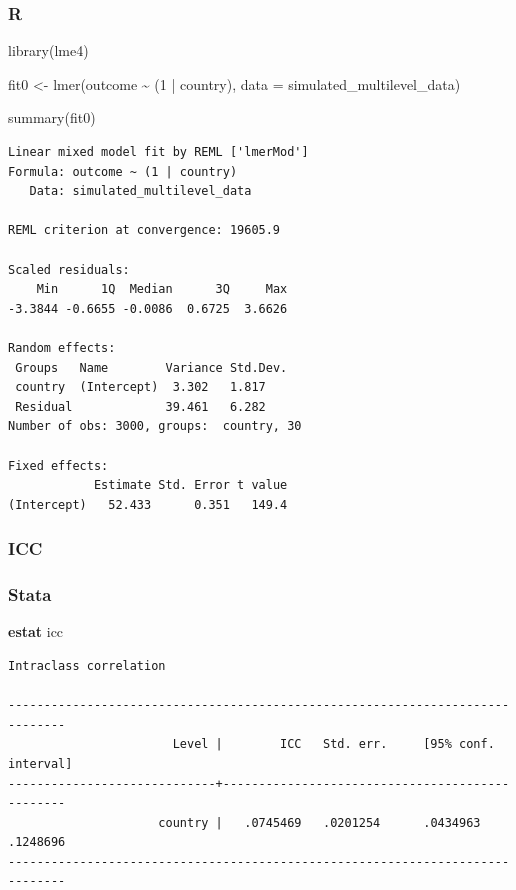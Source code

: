 \documentclass[
  letterpaper,
  DIV=11,
  numbers=noendperiod]{scrreprt}
\newenvironment{Shaded}{\begin{snugshade}}{\end{snugshade}}
\newcommand{\AttributeTok}[1]{\textcolor[rgb]{0.40,0.45,0.13}{#1}}
\newcommand{\DecValTok}[1]{\textcolor[rgb]{0.68,0.00,0.00}{#1}}
\newcommand{\FunctionTok}[1]{\textcolor[rgb]{0.28,0.35,0.67}{#1}}
\newcommand{\KeywordTok}[1]{\textcolor[rgb]{0.00,0.23,0.31}{\textbf{#1}}}
\newcommand{\NormalTok}[1]{\textcolor[rgb]{0.00,0.23,0.31}{#1}}
\newcommand{\OtherTok}[1]{\textcolor[rgb]{0.00,0.23,0.31}{#1}}
\newcommand{\SpecialCharTok}[1]{\textcolor[rgb]{0.37,0.37,0.37}{#1}}
\begin{document}
\subsubsection{R}

\begin{Shaded}
\begin{Highlighting}[]
\FunctionTok{library}\NormalTok{(lme4)}

\NormalTok{fit0 }\OtherTok{\textless{}{-}} \FunctionTok{lmer}\NormalTok{(outcome }\SpecialCharTok{\textasciitilde{}}\NormalTok{  (}\DecValTok{1} \SpecialCharTok{|}\NormalTok{ country),}
             \AttributeTok{data =}\NormalTok{ simulated\_multilevel\_data)}

\FunctionTok{summary}\NormalTok{(fit0)}
\end{Highlighting}
\end{Shaded}

\begin{verbatim}
Linear mixed model fit by REML ['lmerMod']
Formula: outcome ~ (1 | country)
   Data: simulated_multilevel_data

REML criterion at convergence: 19605.9

Scaled residuals: 
    Min      1Q  Median      3Q     Max 
-3.3844 -0.6655 -0.0086  0.6725  3.6626 

Random effects:
 Groups   Name        Variance Std.Dev.
 country  (Intercept)  3.302   1.817   
 Residual             39.461   6.282   
Number of obs: 3000, groups:  country, 30

Fixed effects:
            Estimate Std. Error t value
(Intercept)   52.433      0.351   149.4
\end{verbatim}

\subsubsection{ICC}\label{icc}

\subsubsection{Stata}

\begin{Shaded}
\begin{Highlighting}[]

\KeywordTok{estat}\NormalTok{ icc}
\end{Highlighting}
\end{Shaded}

\begin{verbatim}
Intraclass correlation

------------------------------------------------------------------------------
                       Level |        ICC   Std. err.     [95% conf. interval]
-----------------------------+------------------------------------------------
                     country |   .0745469   .0201254      .0434963    .1248696
------------------------------------------------------------------------------
\end{verbatim}
\end{document}
